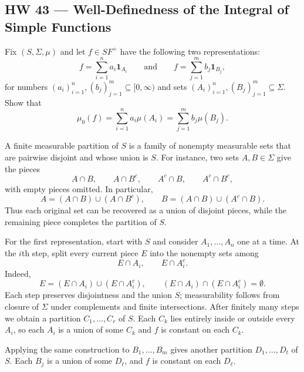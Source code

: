 \subsection*{HW 43 --- Well-Definedness of the Integral of Simple Functions}%
%

 Fix $(S,\Sigma,\mu)$ and let $f\in SF^+$ have the following two representations:
\[
f=\sum_{i=1}^{n}a_i\mathbf1_{A_i}
\qquad\text{and}\qquad
f=\sum_{j=1}^{m}b_j\mathbf1_{B_j},
\]
for numbers $(a_i)_{i=1}^{n},(b_j)_{j=1}^{m}\subseteq[0,\infty)$ and sets
$(A_i)_{i=1}^{n},(B_j)_{j=1}^{m}\subseteq\Sigma$. Show that
\[
\mu_0(f)=\sum_{i=1}^{n}a_i\mu(A_i)
=\sum_{j=1}^{m}b_j\mu(B_j).
\]

\par\noindent{}\par\nobreak

\par\noindent{}\par\nobreak

A finite measurable partition of $S$ is a family of nonempty measurable sets that are pairwise disjoint and whose union is $S$. For instance, two sets $A,B\in\Sigma$ give the pieces
\[
A\cap B,\qquad A\cap B^c,\qquad A^c\cap B,\qquad A^c\cap B^c,
\]
with empty pieces omitted. In particular,
\[
A=(A\cap B)\cup(A\cap B^c),\qquad
B=(A\cap B)\cup(A^c\cap B).
\]
Thus each original set can be recovered as a union of disjoint pieces, while the remaining piece completes the partition of $S$.

For the first representation, start with $S$ and consider $A_1,\ldots,A_n$ one at a time. At the $i$th step, split every current piece $E$ into the nonempty sets among
\[
E\cap A_i,\qquad E\cap A_i^c.
\]
Indeed,
\[
E=(E\cap A_i)\cup(E\cap A_i^c),\qquad
(E\cap A_i)\cap(E\cap A_i^c)=\emptyset.
\]
Each step preserves disjointness and the union $S$; measurability follows from closure of $\Sigma$ under complements and finite intersections. After finitely many steps we obtain a partition $C_1,\ldots,C_r$ of $S$. Each $C_k$ lies entirely inside or outside every $A_i$, so each $A_i$ is a union of some $C_k$ and $f$ is constant on each $C_k$.

Applying the same construction to $B_1,\ldots,B_m$ gives another partition $D_1,\ldots,D_t$ of $S$. Each $B_j$ is a union of some $D_\ell$, and $f$ is constant on each $D_\ell$.


